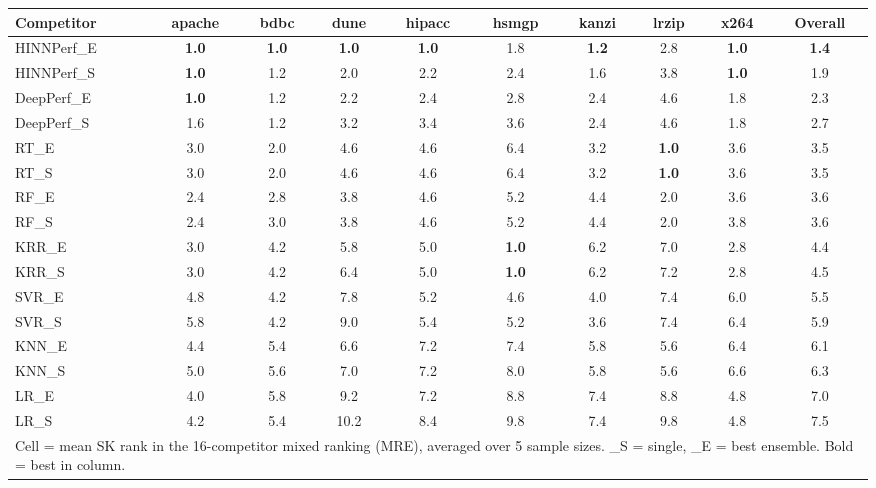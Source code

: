 \begin{tabular}{lccccccccc}
\toprule
Competitor & apache & bdbc & dune & hipacc & hsmgp & kanzi & lrzip & x264 & Overall \\
\midrule
\midrule
HINNPerf\_E & \textbf{1.0} & \textbf{1.0} & \textbf{1.0} & \textbf{1.0} & 1.8 & \textbf{1.2} & 2.8 & \textbf{1.0} & \textbf{1.4} \\
HINNPerf\_S & \textbf{1.0} & 1.2 & 2.0 & 2.2 & 2.4 & 1.6 & 3.8 & \textbf{1.0} & 1.9 \\
DeepPerf\_E & \textbf{1.0} & 1.2 & 2.2 & 2.4 & 2.8 & 2.4 & 4.6 & 1.8 & 2.3 \\
DeepPerf\_S & 1.6 & 1.2 & 3.2 & 3.4 & 3.6 & 2.4 & 4.6 & 1.8 & 2.7 \\
RT\_E & 3.0 & 2.0 & 4.6 & 4.6 & 6.4 & 3.2 & \textbf{1.0} & 3.6 & 3.5 \\
RT\_S & 3.0 & 2.0 & 4.6 & 4.6 & 6.4 & 3.2 & \textbf{1.0} & 3.6 & 3.5 \\
RF\_E & 2.4 & 2.8 & 3.8 & 4.6 & 5.2 & 4.4 & 2.0 & 3.6 & 3.6 \\
RF\_S & 2.4 & 3.0 & 3.8 & 4.6 & 5.2 & 4.4 & 2.0 & 3.8 & 3.6 \\
KRR\_E & 3.0 & 4.2 & 5.8 & 5.0 & \textbf{1.0} & 6.2 & 7.0 & 2.8 & 4.4 \\
KRR\_S & 3.0 & 4.2 & 6.4 & 5.0 & \textbf{1.0} & 6.2 & 7.2 & 2.8 & 4.5 \\
SVR\_E & 4.8 & 4.2 & 7.8 & 5.2 & 4.6 & 4.0 & 7.4 & 6.0 & 5.5 \\
SVR\_S & 5.8 & 4.2 & 9.0 & 5.4 & 5.2 & 3.6 & 7.4 & 6.4 & 5.9 \\
KNN\_E & 4.4 & 5.4 & 6.6 & 7.2 & 7.4 & 5.8 & 5.6 & 6.4 & 6.1 \\
KNN\_S & 5.0 & 5.6 & 7.0 & 7.2 & 8.0 & 5.8 & 5.6 & 6.6 & 6.3 \\
LR\_E & 4.0 & 5.8 & 9.2 & 7.2 & 8.8 & 7.4 & 8.8 & 4.8 & 7.0 \\
LR\_S & 4.2 & 5.4 & 10.2 & 8.4 & 9.8 & 7.4 & 9.8 & 4.8 & 7.5 \\
\bottomrule
\multicolumn{10}{l}{\footnotesize Cell = mean SK rank in the 16-competitor mixed ranking (MRE), averaged over 5 sample sizes. \_S = single, \_E = best ensemble. Bold = best in column.} \\
\end{tabular}
